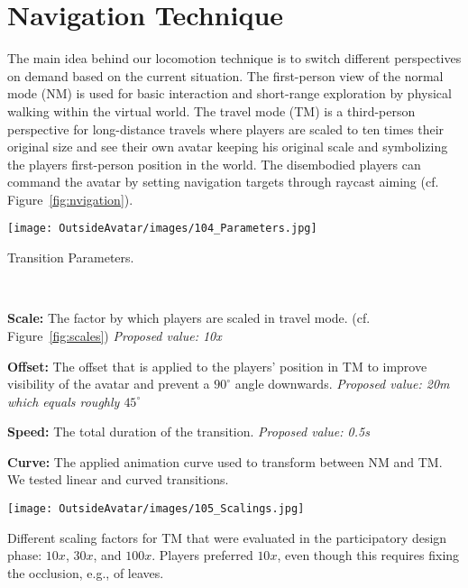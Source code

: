 \documentclass[sigchi-a, authorversion]{acmart}
\begin{document}
\section{Navigation Technique}
The main idea behind our locomotion technique is to switch different perspectives on demand based on the current situation. The first-person view of the normal mode (NM) is used for basic interaction and short-range exploration by physical walking within the virtual world. The travel mode (TM) is a third-person perspective for long-distance travels where players are scaled to ten times their original size and see their own avatar keeping his original scale and symbolizing the players first-person position in the world. The disembodied players can command the avatar by setting navigation targets through raycast aiming (cf. Figure~\ref{fig:nvigation}).
\begin{marginfigure}
     \begin{minipage}{\marginparwidth} 
    \texttt{[image: OutsideAvatar/images/104\_Parameters.jpg]}
    \vspace{-1em}
    \begin{flushleft}\caption{Transition Parameters.}~\label{fig:transitionParameters}\end{flushleft}
    \vspace{-1em}
    \textbf{Scale:} The factor by which players are scaled in travel mode. (cf. Figure~\ref{fig:scales}) \textit{Proposed value: 10x}
    
    \textbf{Offset:} The offset that is applied to the players' position in TM to improve visibility of the avatar and prevent a $90^\circ$ angle downwards. \textit{Proposed value: 20m which equals roughly $45^\circ$ }
    
    \textbf{Speed:} The total duration of the transition.   \textit{Proposed value: 0.5s}
    
    \textbf{Curve:} The applied animation curve used to transform between NM and TM. We tested linear and curved transitions.
    \vspace{1em}
    \end{minipage}
\end{marginfigure}
\begin{marginfigure}
    \texttt{[image: OutsideAvatar/images/105\_Scalings.jpg]}
    \caption{Different scaling factors for TM that were evaluated in the participatory design phase: $10x$, $30x$, and $100x$. Players preferred $10x$, even though this requires fixing the occlusion, e.g., of leaves.}~\label{fig:scales}
\end{marginfigure}
\end{document}
